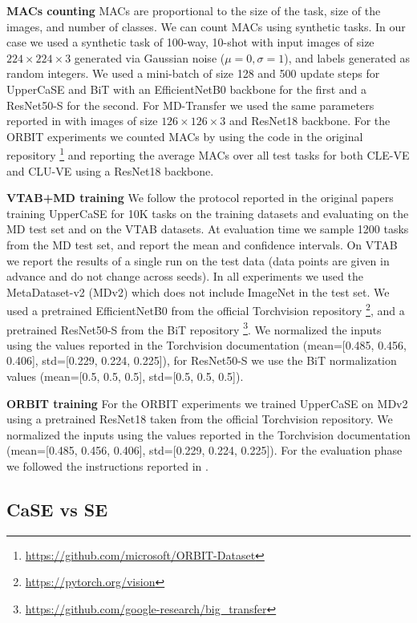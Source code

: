 \documentclass{article}
\begin{document}
\textbf{MACs counting} MACs are proportional to the size of the task, size of the images, and number of classes. We can count MACs using synthetic tasks. In our case we used a synthetic task of 100-way, 10-shot with input images of size $224 \times 224 \times 3$ generated via Gaussian noise ($\mu=0, \sigma=1$), and labels generated as random integers. We used a mini-batch of size 128 and 500 update steps for UpperCaSE and BiT with an EfficientNetB0 backbone for the first and a ResNet50-S for the second. For MD-Transfer we used the same parameters reported in \cite{dumoulin2021comparing} with images of size $126 \times 126 \times 3$ and ResNet18 backbone. For the ORBIT experiments we counted MACs by using the code in the original repository \footnote{\url{https://github.com/microsoft/ORBIT-Dataset}} and reporting the average MACs over all test tasks for both CLE-VE and CLU-VE using a ResNet18 backbone.

\textbf{VTAB+MD training} We follow the protocol reported in the original papers \citep{triantafillou2019meta, dumoulin2021comparing} training UpperCaSE for 10K tasks on the training datasets and evaluating on the MD test set and on the VTAB datasets. At evaluation time we sample 1200 tasks from the MD test set, and report the mean and confidence intervals. On VTAB we report the results of a single run on the test data (data points are given in advance and do not change across seeds).
In all experiments we used the MetaDataset-v2 (MDv2) which does not include ImageNet in the test set. We used a pretrained EfficientNetB0 from the official Torchvision repository \footnote{\url{https://pytorch.org/vision}}, and a pretrained ResNet50-S from the BiT repository \footnote{\url{https://github.com/google-research/big_transfer}}. We normalized the inputs using the values reported in the Torchvision documentation (mean=[0.485, 0.456, 0.406], std=[0.229, 0.224, 0.225]), for ResNet50-S we use the BiT normalization values (mean=[0.5, 0.5, 0.5], std=[0.5, 0.5, 0.5]).

\textbf{ORBIT training} For the ORBIT experiments we trained UpperCaSE on MDv2 using a pretrained ResNet18 taken from the official Torchvision repository. We normalized the inputs using the values reported in the Torchvision documentation (mean=[0.485, 0.456, 0.406], std=[0.229, 0.224, 0.225]).
For the evaluation phase we followed the instructions reported in \cite{massiceti2021orbit}. 

\subsection{CaSE vs SE} \label{appendix:ssec_case_vs_se}
\end{document}
